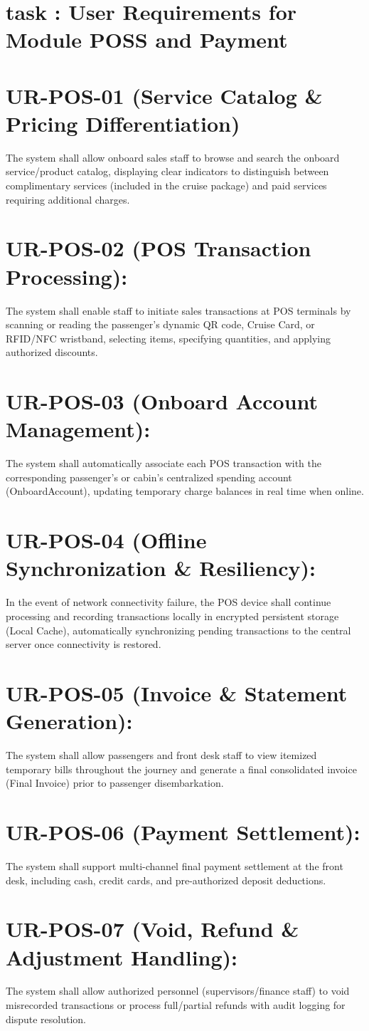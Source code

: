 \documentclass[10pt,a4paper]{article}
\begin{document}
	\section*{task : User Requirements for Module POSS and Payment}
	\section*{UR-POS-01 (Service Catalog \& Pricing Differentiation)} The system shall allow onboard sales staff to browse and search the onboard service/product catalog, displaying clear indicators to distinguish between complimentary services (included in the cruise package) and paid services requiring additional charges.
	\section*{UR-POS-02 (POS Transaction Processing):} The system shall enable staff to initiate sales transactions at POS terminals by scanning or reading the passenger's dynamic QR code, Cruise Card, or RFID/NFC wristband, selecting items, specifying quantities, and applying authorized discounts.
	\section*{UR-POS-03 (Onboard Account Management):} The system shall automatically associate each POS transaction with the corresponding passenger's or cabin's centralized spending account (OnboardAccount), updating temporary charge balances in real time when online.
	\section*{UR-POS-04 (Offline Synchronization \& Resiliency):} In the event of network connectivity failure, the POS device shall continue processing and recording transactions locally in encrypted persistent storage (Local Cache), automatically synchronizing pending transactions to the central server once connectivity is restored.
	\section*{UR-POS-05 (Invoice \& Statement Generation):} The system shall allow passengers and front desk staff to view itemized temporary bills throughout the journey and generate a final consolidated invoice (Final Invoice) prior to passenger disembarkation.
	\section*{UR-POS-06 (Payment Settlement):} The system shall support multi-channel final payment settlement at the front desk, including cash, credit cards, and pre-authorized deposit deductions.
	\section*{UR-POS-07 (Void, Refund \& Adjustment Handling):} The system shall allow authorized personnel (supervisors/finance staff) to void misrecorded transactions or process full/partial refunds with audit logging for dispute resolution.
\end{document}

